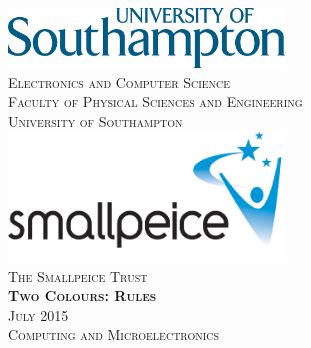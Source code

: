 \documentclass[twoside,12pt,a4paper,titlepage]{article}
\title{\gamename}
\author{\org}
\date{\timeline}
\newcommand{\gamename}{Two Colours\xspace}
\newcommand{\timeline}{July 2015\xspace}
\begin{document}
\begin{titlepage}
\begin{center}
\includegraphics[width=0.55\textwidth]{./soton_logo.eps}~\\[1cm]
\textsc{\large Electronics and Computer Science}\\[0.2cm]
\textsc{\large Faculty of Physical Sciences and Engineering}\\[0.2cm]
\textsc{\large University of Southampton}\\[3.5cm]
\includegraphics[width=0.55\textwidth]{./smallpeice_logo.jpg}~\\[1cm]
\textsc{\large The Smallpeice Trust}\\[3.5cm]
\textsc{\huge \textbf{\gamename{}: Rules}}\\[1cm]
\textsc{\large \timeline}\\[3cm]
\textsc{\Large Computing and Microelectronics}
\end{center}
\end{titlepage}


\clearpage

\clearpage

\clearpage

\end{document}
